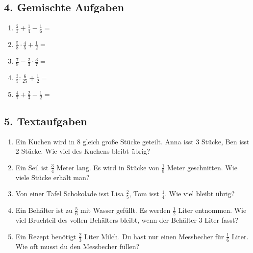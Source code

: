 \subsection*{4. Gemischte Aufgaben}
\begin{enumerate}[label=\alph*)]
    \item \( \frac{2}{3} + \frac{1}{4} - \frac{1}{6} = \)
    \item \( \frac{5}{8} \cdot \frac{4}{5} + \frac{1}{2} = \)
    \item \( \frac{7}{9} - \frac{2}{3} \cdot \frac{3}{7} = \)
    \item \( \frac{3}{5} : \frac{6}{25} + \frac{1}{2} = \)
    \item \( \frac{4}{7} + \frac{2}{3} - \frac{1}{2} = \)
\end{enumerate}

\subsection*{5. Textaufgaben}
\begin{enumerate}[label=\alph*)]
    \item Ein Kuchen wird in 8 gleich große Stücke geteilt. Anna isst 3 Stücke, Ben isst 2 Stücke. Wie viel des Kuchens bleibt übrig?
    \item Ein Seil ist $\frac{3}{4}$ Meter lang. Es wird in Stücke von $\frac{1}{8}$ Meter geschnitten. Wie viele Stücke erhält man?
    \item Von einer Tafel Schokolade isst Lisa $\frac{2}{5}$, Tom isst $\frac{1}{4}$. Wie viel bleibt übrig?
    \item Ein Behälter ist zu $\frac{5}{6}$ mit Wasser gefüllt. Es werden $\frac{1}{2}$ Liter entnommen. Wie viel Bruchteil des vollen Behälters bleibt, wenn der Behälter 3 Liter fasst?
    \item Ein Rezept benötigt $\frac{2}{3}$ Liter Milch. Du hast nur einen Messbecher für $\frac{1}{6}$ Liter. Wie oft musst du den Messbecher füllen?
\end{enumerate}